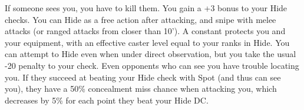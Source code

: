 {If someone sees you, you have to kill them.}
{You gain a +3 bonus to your Hide checks.}
{You can Hide as a free action after attacking, and snipe with melee attacks (or ranged attacks from closer than 10').}
{A constant  protects you and your equipment, with an effective caster level equal to your ranks in Hide.}
{You can attempt to Hide even when under direct observation, but you take the usual -20 penalty to your check.}
{Even opponents who can see you have trouble locating you. If they succeed at beating your Hide check with Spot (and thus can see you), they have a 50\% concealment miss chance when attacking you, which decreases by 5\% for each point they beat your Hide DC.}